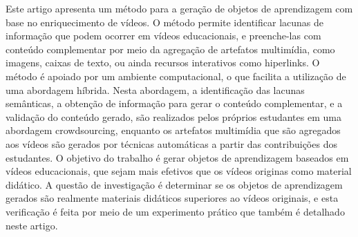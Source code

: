 Este artigo apresenta um método para a geração de objetos de aprendizagem com base no enriquecimento de vídeos. O método permite identificar lacunas de informação que podem ocorrer em vídeos educacionais, e preenche-las com conteúdo complementar por meio da agregação de artefatos multimídia, como imagens, caixas de texto, ou ainda recursos interativos como hiperlinks. O método é apoiado por um ambiente computacional, o que facilita a utilização de uma abordagem híbrida. Nesta abordagem, a identificação das lacunas semânticas, a obtenção de informação para gerar o conteúdo complementar, e a validação do conteúdo gerado, são realizados pelos próprios estudantes em uma abordagem crowdsourcing, enquanto os artefatos multimídia que são agregados aos vídeos são gerados por técnicas automáticas a partir das contribuições dos estudantes. O objetivo do trabalho é gerar objetos de aprendizagem baseados em vídeos educacionais, que sejam mais efetivos que os vídeos originas como material didático. A questão de investigação é determinar se os objetos de aprendizagem gerados são realmente materiais didáticos superiores ao vídeos originais, e esta verificação é feita por meio de um experimento prático que também é detalhado neste artigo.